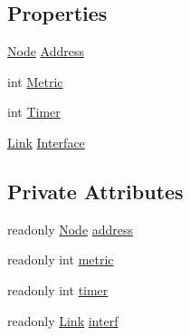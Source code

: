 \subsection*{Properties}
\begin{DoxyCompactItemize}
\item 
\hyperlink{classNetTrafficSimulator_1_1Node}{Node} \hyperlink{classNetTrafficSimulator_1_1RIP_1_1RoutingDatabaseEntry_afc895a6fe5f36de755d56bd14b32d451}{Address}
\item 
int \hyperlink{classNetTrafficSimulator_1_1RIP_1_1RoutingDatabaseEntry_a27477da965ac2c0ca2d3ef01a8e9dab2}{Metric}
\item 
int \hyperlink{classNetTrafficSimulator_1_1RIP_1_1RoutingDatabaseEntry_a19b3955d1a5855158bf0aa52a23643be}{Timer}
\item 
\hyperlink{classNetTrafficSimulator_1_1Link}{Link} \hyperlink{classNetTrafficSimulator_1_1RIP_1_1RoutingDatabaseEntry_a34f73c564ca43d83828d603f15ed0a13}{Interface}
\end{DoxyCompactItemize}
\subsection*{Private Attributes}
\begin{DoxyCompactItemize}
\item 
readonly \hyperlink{classNetTrafficSimulator_1_1Node}{Node} \hyperlink{classNetTrafficSimulator_1_1RIP_1_1RoutingDatabaseEntry_acc483d92d46309fa5f08e45820f62784}{address}
\item 
readonly int \hyperlink{classNetTrafficSimulator_1_1RIP_1_1RoutingDatabaseEntry_a82a8ca4b7eb56eb4b98675ab4cbc0c07}{metric}
\item 
readonly int \hyperlink{classNetTrafficSimulator_1_1RIP_1_1RoutingDatabaseEntry_ac803f65d2cc853d6d663bb3336559b8b}{timer}
\item 
readonly \hyperlink{classNetTrafficSimulator_1_1Link}{Link} \hyperlink{classNetTrafficSimulator_1_1RIP_1_1RoutingDatabaseEntry_af8446afd63115da4ec4bc1efa484db2b}{interf}
\end{DoxyCompactItemize}


